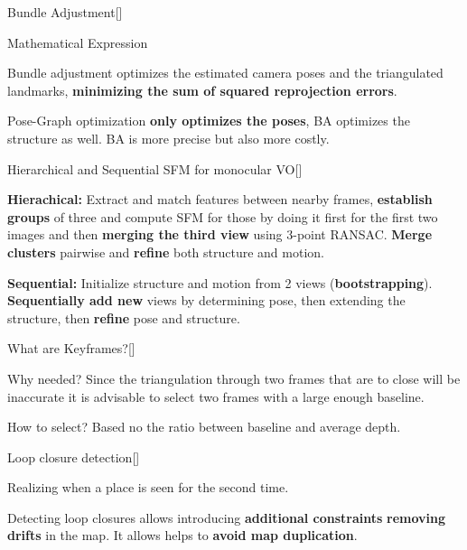 \documentclass[10pt,a4paper]{scrartcl}
\begin{document}
\begin{multicols*}{2}
\begin{QandA}
{Bundle Adjustment}[\Definition]
\item Mathematical Expression

\item Bundle adjustment optimizes the estimated camera poses and the triangulated landmarks, \textbf{minimizing the sum of squared reprojection errors}.
\item Pose-Graph optimization \textbf{only optimizes the poses}, BA optimizes the structure as well. BA is more precise but also more costly.
\end{QandA}

\begin{QandA}
{Hierarchical and Sequential SFM for monocular VO}[\Definition]
\item \textbf{Hierachical:} Extract and match features between nearby frames, \textbf{establish groups} of three and compute SFM for those by doing it first for the first two images and then \textbf{merging the third view} using 3-point RANSAC. \textbf{Merge clusters} pairwise and \textbf{refine} both structure and motion.
\item \textbf{Sequential:} Initialize structure and motion from 2 views (\textbf{bootstrapping}). \textbf{Sequentially add new} views by determining pose, then extending the structure, then \textbf{refine} pose and structure.
\end{QandA}

\begin{QandA}
{What are Keyframes?}[\Definition]
\item Why needed? Since the triangulation through two frames that are to close will be inaccurate it is advisable to select two frames with a large enough baseline.

\item How to select? Based no the ratio between baseline and average depth.
\end{QandA}

\begin{QandA}{Loop closure detection}[\Definition]
\item Realizing when a place is seen for the second time.
\item Detecting loop closures allows introducing \textbf{additional constraints} \textbf{removing drifts} in the map. It allows helps to \textbf{avoid map duplication}.
\end{QandA}


\end{multicols*}
\end{document}
